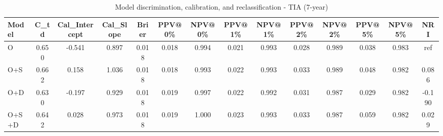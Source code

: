 \begin{table}[htbp]
\centering
\small
\caption{Model discrimination, calibration, and reclassification - TIA (7-year)}
\label{tab:perf_tia_7y}
\begin{tabular}{lccccccccccccc}
\toprule
Model & C\_td & Cal\_Intercept & Cal\_Slope & Brier & PPV@0\% & NPV@0\% & PPV@1\% & NPV@1\% & PPV@2\% & NPV@2\% & PPV@5\% & NPV@5\% & NRI \\
\midrule
O & 0.650 & -0.541 & 0.897 & 0.018 & 0.018 & 0.994 & 0.021 & 0.993 & 0.028 & 0.989 & 0.038 & 0.983 & ref \\
O+S & 0.662 & 0.158 & 1.036 & 0.018 & 0.018 & 0.993 & 0.022 & 0.993 & 0.033 & 0.989 & 0.048 & 0.982 & 0.086 \\
O+D & 0.630 & -0.197 & 0.929 & 0.018 & 0.019 & 0.997 & 0.022 & 0.992 & 0.031 & 0.987 & 0.029 & 0.982 & -0.190 \\
O+S+D & 0.642 & 0.028 & 0.973 & 0.018 & 0.019 & 1.000 & 0.023 & 0.993 & 0.033 & 0.987 & 0.059 & 0.982 & 0.029 \\
\bottomrule
\end{tabular}
\end{table}